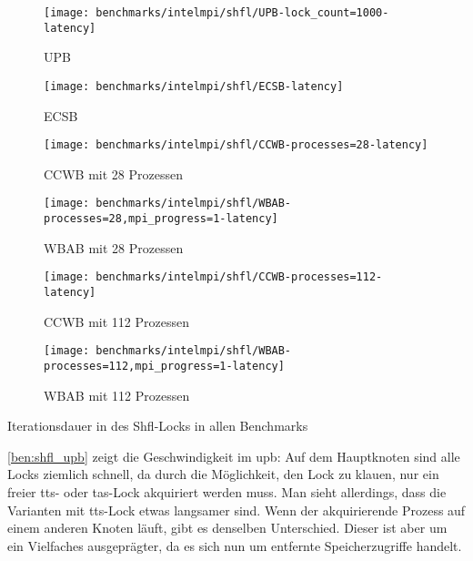 \begin{benchmark}[!h]
    \begin{subfigure}{.5\textwidth}
        \texttt{[image: benchmarks/intelmpi/shfl/UPB-lock\_count=1000-latency]}
        \caption{UPB}
        \label{ben:shfl_upb}
    \end{subfigure}
    \begin{subfigure}{.5\textwidth}
        \texttt{[image: benchmarks/intelmpi/shfl/ECSB-latency]}
        \caption{ECSB}
        \label{ben:shfl_ecsb}
    \end{subfigure}
    \begin{subfigure}{.5\textwidth}
        \texttt{[image: benchmarks/intelmpi/shfl/CCWB-processes=28-latency]}
        \caption{CCWB mit 28 Prozessen}
        \label{ben:shfl_ccwb_28}
    \end{subfigure}
    \begin{subfigure}{.5\textwidth}
        \texttt{[image: benchmarks/intelmpi/shfl/WBAB-processes=28,mpi\_progress=1-latency]}
        \caption{WBAB mit 28 Prozessen}
        \label{ben:shfl_wbab_28}
    \end{subfigure}
    \begin{subfigure}{.5\textwidth}
        \texttt{[image: benchmarks/intelmpi/shfl/CCWB-processes=112-latency]}
        \caption{CCWB mit 112 Prozessen}
        \label{ben:shfl_ccwb_112}
    \end{subfigure}
    \begin{subfigure}{.5\textwidth}
        \texttt{[image: benchmarks/intelmpi/shfl/WBAB-processes=112,mpi\_progress=1-latency]}
        \caption{WBAB mit 112 Prozessen}
        \label{ben:shfl_wbab_112}
    \end{subfigure}
    \caption{Iterationsdauer in  des Shfl-Locks in allen Benchmarks}
    \label{ben:shfl}
\end{benchmark}

\autoref{ben:shfl_upb} zeigt die Geschwindigkeit im \gls{upb}:
Auf dem Hauptknoten sind alle Locks ziemlich schnell,
da durch die Möglichkeit,
den Lock zu klauen,
nur ein freier \gls{tts}- oder \gls{tas}-Lock akquiriert werden muss.
Man sieht allerdings,
dass die Varianten mit \gls{tts}-Lock etwas langsamer sind.
Wenn der akquirierende Prozess auf einem anderen Knoten läuft,
gibt es denselben Unterschied.
Dieser ist aber um ein Vielfaches ausgeprägter,
da es sich nun um entfernte Speicherzugriffe handelt.

